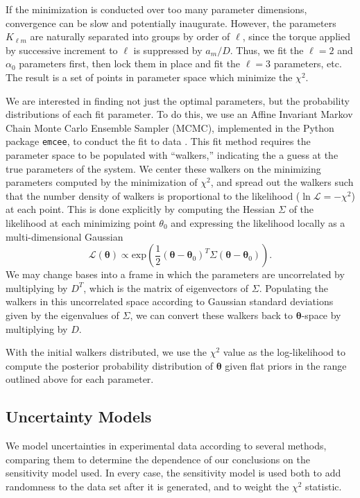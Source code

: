 \documentclass[11pt]{article}
\newcommand{\parens}[1]{\left( #1 \right)}
\begin{document}
If the minimization is conducted over too many parameter dimensions, convergence can be slow and potentially inaugurate. However, the parameters $K_{\ell m}$ are naturally separated into groups by order of $\ell$, since the torque applied by successive increment to $\ell$ is suppressed by $a_m/D$. Thus, we fit the $\ell=2$ and $\alpha_0$ parameters first, then lock them in place and fit the $\ell=3$ parameters, etc. The result is a set of points in parameter space which minimize the $\chi^2$.

We are interested in finding not just the optimal parameters, but the probability distributions of each fit parameter. To do this, we use an Affine Invariant Markov Chain Monte Carlo Ensemble Sampler (MCMC), implemented in the Python package \texttt{emcee}, to conduct the fit to data \cite{ForemanMackey2013emceeTM}. This fit method requires the parameter space to be populated with ``walkers,'' indicating the a guess at the true parameters of the system. We center these walkers on the minimizing parameters computed by the minimization of $\chi^2$, and spread out the walkers such that the number density of walkers is proportional to the likelihood ($\ln \mathcal{L} = -\chi^2$) at each point. This is done explicitly by computing the Hessian $\Sigma$ of the likelihood at each minimizing point $\theta_0$ and expressing the likelihood locally as a multi-dimensional Gaussian
\begin{equation}
\mathcal{L}(\bm \theta) \propto \text{exp}\parens{\frac{1}{2}(\bm \theta-\bm \theta_0)^T \Sigma (\bm \theta-\bm \theta_0)}.
\end{equation}
We may change bases into a frame in which the parameters are uncorrelated by multiplying by $D^T$, which is the matrix of eigenvectors of $\Sigma$. Populating the walkers in this uncorrelated space according to Gaussian standard deviations given by the eigenvalues of $\Sigma$, we can convert these walkers back to $\bm \theta$-space by multiplying by $D$.

With the initial walkers distributed, we use the $\chi^2$ value as the log-likelihood to compute the posterior probability distribution of $\bm \theta$ given flat priors in the range outlined above for each parameter.


\subsection{Uncertainty Models}
\label{sec:uncertainty-models}
We model uncertainties in experimental data according to several methods, comparing them to determine the dependence of our conclusions on the sensitivity model used. In every case, the sensitivity model is used both to add randomness to the data set after it is generated, and to weight the $\chi^2$ statistic.
\end{document}
